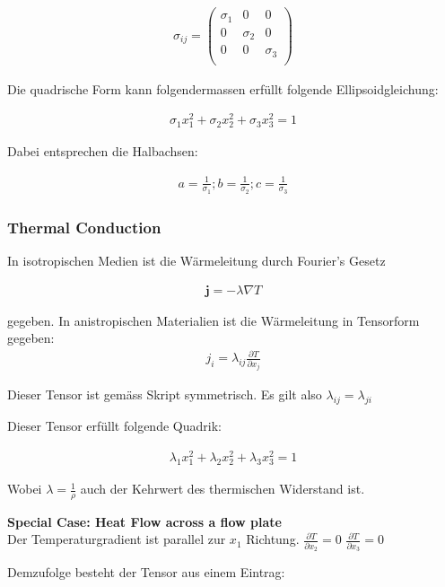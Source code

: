 \documentclass[a4paper]{scrartcl}
\begin{document}
\begin{align}
\sigma_{ij}=\begin{pmatrix}
\sigma_1 & 0 & 0 \\
0 & \sigma_2 & 0 \\
0 & 0 & \sigma_3 \\
\end{pmatrix}
\end{align}

Die quadrische Form kann folgendermassen erfüllt folgende Ellipsoidgleichung:

\begin{align}
\sigma_1x_1^2+\sigma_2x_2^2+\sigma_3x_3^2=1
\end{align}


Dabei entsprechen die Halbachsen:

\begin{align}
a=\frac{1}{\sigma_1}; b=\frac{1}{\sigma_2}; c=\frac{1}{\sigma_3}
\end{align}

\subsubsection{Thermal Conduction}
In isotropischen Medien ist die Wärmeleitung durch Fourier's Gesetz

\begin{align}
\mathbf{j}=-\lambda \nabla T
\end{align}

gegeben. In anistropischen Materialien ist die Wärmeleitung in Tensorform
gegeben:
\begin{align}
j_i=\lambda_{ij}\frac{\partial T}{\partial x_j}
\end{align}

Dieser Tensor ist gemäss Skript symmetrisch. Es gilt also
$\lambda_{ij}=\lambda_{ji}$

Dieser Tensor erfüllt folgende Quadrik:

\begin{align}
\lambda_1 x_1^2+\lambda_2 x_2^2+\lambda_3 x_3^2=1
\end{align}

Wobei $\lambda=\frac{1}{\rho}$ auch der Kehrwert des thermischen Widerstand ist.

\textbf{Special Case: Heat Flow across a flow plate} \\
Der Temperaturgradient ist parallel zur $x_1$ Richtung. $\frac{\partial
T}{\partial x_2}=0$ $\frac{\partial T}{\partial x_3}=0$

Demzufolge besteht der Tensor aus einem Eintrag:
\end{document}
